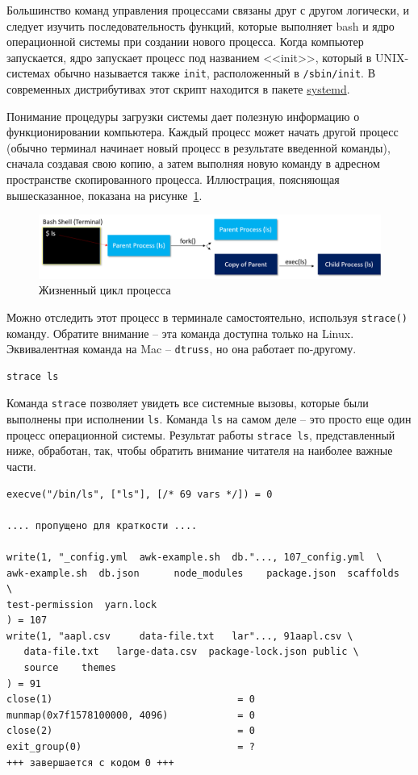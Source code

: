 \documentclass[12pt]{article}
\begin{document}
Большинство команд управления процессами связаны друг с другом логически, и следует
изучить последовательность функций, которые выполняет bash и
ядро операционной системы при создании нового процесса. Когда компьютер
запускается, ядро запускает процесс под названием <<init>>, который в
UNIX-системах обычно называется также \texttt{init}, расположенный в
\texttt{/sbin/init}. В современных дистрибутивах этот скрипт находится в
пакете \href{https://en.wikipedia.org/wiki/Systemd}{systemd}.

Понимание процедуры загрузки системы дает полезную информацию о функционировании компьютера.
Каждый процесс может начать другой процесс
(обычно терминал начинает новый процесс в результате введенной команды),
сначала создавая свою копию, а затем выполняя новую команду в адресном
пространстве скопированного процесса. Иллюстрация, поясняющая
вышесказанное, показана на рисунке~\ref{fig:proclc}.
\begin{figure}[tbh]
  \centering

  \includegraphics[width=\linewidth]{blog/2019/bash-essentials/processes-linux.png}
  \caption{Жизненный цикл процесса}
  \label{fig:proclc}
\end{figure}

Можно отследить этот процесс в терминале самостоятельно, используя
\texttt{strace()} команду. Обратите внимание -- эта команда доступна
только на Linux. Эквивалентная команда на Mac -- \texttt{dtruss}, но она
работает по-другому.
\begin{verbatim}
strace ls
\end{verbatim}

Команда \texttt{strace} позволяет увидеть все системные вызовы, которые были
выполнены при исполнении \texttt{ls}. Команда \texttt{ls} на самом деле --
это просто еще один процесс операционной системы. Результат работы
\texttt{strace\ ls}, представленный ниже, обработан, так, чтобы обратить
внимание читателя на наиболее важные части.

\begin{verbatim}
execve("/bin/ls", ["ls"], [/* 69 vars */]) = 0

.... пропущено для краткости ....

write(1, "_config.yml  awk-example.sh  db."..., 107_config.yml  \
awk-example.sh  db.json      node_modules    package.json  scaffolds  \
test-permission  yarn.lock
) = 107
write(1, "aapl.csv     data-file.txt   lar"..., 91aapl.csv \
   data-file.txt   large-data.csv  package-lock.json public \
   source    themes
) = 91
close(1)                                = 0
munmap(0x7f1578100000, 4096)            = 0
close(2)                                = 0
exit_group(0)                           = ?
+++ завершается с кодом 0 +++
\end{verbatim}
\end{document}
